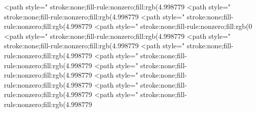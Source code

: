 <path style=" stroke:none;fill-rule:nonzero;fill:rgb(4.998779%
<path style=" stroke:none;fill-rule:nonzero;fill:rgb(4.998779%
<path style=" stroke:none;fill-rule:nonzero;fill:rgb(4.998779%
<path style=" stroke:none;fill-rule:nonzero;fill:rgb(0%
<path style=" stroke:none;fill-rule:nonzero;fill:rgb(4.998779%
<path style=" stroke:none;fill-rule:nonzero;fill:rgb(4.998779%
<path style=" stroke:none;fill-rule:nonzero;fill:rgb(4.998779%
<path style=" stroke:none;fill-rule:nonzero;fill:rgb(4.998779%
<path style=" stroke:none;fill-rule:nonzero;fill:rgb(4.998779%
<path style=" stroke:none;fill-rule:nonzero;fill:rgb(4.998779%
<path style=" stroke:none;fill-rule:nonzero;fill:rgb(4.998779%
<path style=" stroke:none;fill-rule:nonzero;fill:rgb(4.998779%
